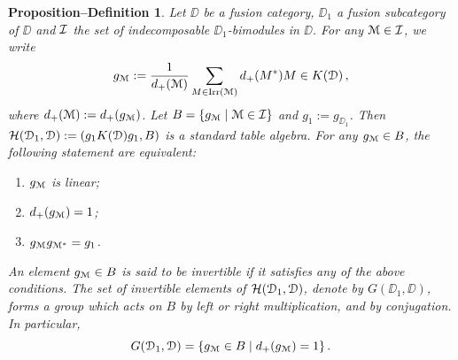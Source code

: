 \documentclass{amsart}
\newtheorem{propdef}[thm]{Proposition--Definition}
\begin{document}
\begin{propdef}\label{pd:table-alg} Let $\DD$ be a fusion category, $\DD_1$ a fusion subcategory of $\DD$ and ${\mathcal{I}}$ the set of indecomposable $\DD_1$-bimodules in $\DD$.  For any ${\EuScript{M}} \in {\mathcal{I}}$, we  write
   $$
    g_{\EuScript{M}} := \frac{1}{d_+({\EuScript{M}})} \sum_{M\in \operatorname{Irr}({\EuScript{M}})} d_+(M^*)M \in K({\EuScript{D}})\,,
    $$
    where $d_+({\EuScript{M}}):=d_+(g_{\EuScript{M}})$. Let $B= \{g_{\EuScript{M}} \mid {\EuScript{M}} \in {\mathcal{I}}\}$ and  $g_1:=g_{\DD_1}$. Then  $\mathcal{H}({\EuScript{D}}_1, {\EuScript{D}}):=(g_1 {K({\EuScript{D}})} g_1, B)$ is a standard table algebra. For any $g_{\EuScript{M}} \in B$, the following statement are equivalent:
    \begin{enumerate}
      \item $g_{\EuScript{M}}$ is linear;
      \item $d_+(g_{\EuScript{M}}) = 1$;
      \item $g_{\EuScript{M}} g_{{\EuScript{M}}^*} = g_1$.
    \end{enumerate}
     An element $g_{\EuScript{M}} \in B$ is said to be \emph{invertible} if it satisfies any of the above conditions. The set of invertible elements of $\mathcal{H}({\EuScript{D}}_1, {\EuScript{D}})$, denote by $G(\DD_1, \DD)$, forms a group which acts on $B$ by left or right multiplication, and by conjugation. In particular, 
     $$
     {G({\EuScript{D}}_1, {\EuScript{D}})} = \{{g_{\EuScript{M}}} \in B \mid d_+({g_{\EuScript{M}}}) =1\}\,.
     $$
\end{propdef}
\end{document}
